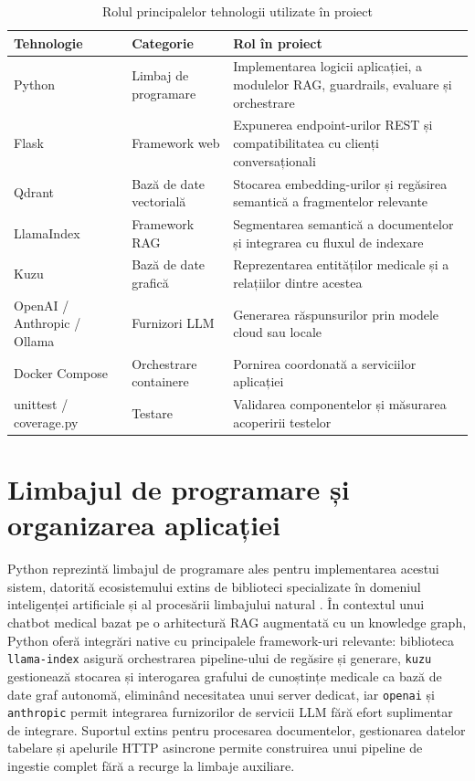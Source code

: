 \documentclass[12pt, a4paper, oneside, romanian]{teza-upb}
\begin{document}
\begin{table}[h]
\centering
\caption{Rolul principalelor tehnologii utilizate în proiect}
\begin{tabular}{|p{3cm}|p{4cm}|p{6cm}|}
\hline
\textbf{Tehnologie} & \textbf{Categorie} & \textbf{Rol în proiect} \\
\hline
Python & Limbaj de programare & Implementarea logicii aplicației, a modulelor RAG, guardrails, evaluare și orchestrare \\
\hline
Flask & Framework web & Expunerea endpoint-urilor REST și compatibilitatea cu clienți conversaționali \\
\hline
Qdrant & Bază de date vectorială & Stocarea embedding-urilor și regăsirea semantică a fragmentelor relevante \\
\hline
LlamaIndex & Framework RAG & Segmentarea semantică a documentelor și integrarea cu fluxul de indexare \\
\hline
Kuzu & Bază de date grafică & Reprezentarea entităților medicale și a relațiilor dintre acestea \\
\hline
OpenAI / Anthropic / Ollama & Furnizori LLM & Generarea răspunsurilor prin modele cloud sau locale \\
\hline
Docker Compose & Orchestrare containere & Pornirea coordonată a serviciilor aplicației \\
\hline
unittest / coverage.py & Testare & Validarea componentelor și măsurarea acoperirii testelor \\
\hline
\end{tabular}
\end{table}

\section{Limbajul de programare și organizarea aplicației}

Python reprezintă limbajul de programare ales pentru implementarea acestui sistem,
datorită ecosistemului extins de biblioteci specializate în domeniul inteligenței
artificiale și al procesării limbajului natural \cite{srinath2017python, llm_review_2024}. În contextul unui
chatbot medical bazat pe o arhitectură RAG augmentată cu un knowledge graph,
Python oferă integrări native cu principalele framework-uri relevante: biblioteca
\texttt{llama-index} asigură orchestrarea pipeline-ului de regăsire și generare,
\texttt{kuzu} gestionează stocarea și interogarea grafului de cunoștințe medicale
ca bază de date graf autonomă, eliminând necesitatea unui server dedicat, iar
\texttt{openai} și \texttt{anthropic} permit integrarea furnizorilor de servicii
LLM fără efort suplimentar de integrare. Suportul extins pentru procesarea
documentelor, gestionarea datelor tabelare și apelurile HTTP asincrone permite
construirea unui pipeline de ingestie complet fără a recurge la limbaje auxiliare.
\end{document}
